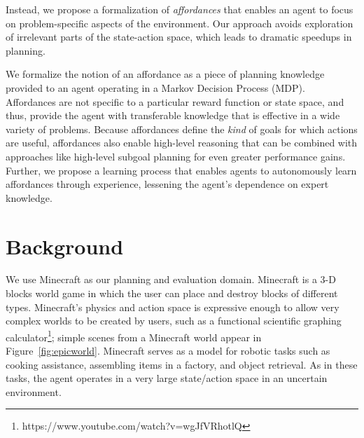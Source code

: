 \documentclass[conference]{IEEEtran}
\begin{document}
Instead, we propose a formalization of {\em affordances} \citep{gibson77} that enables an agent to focus on
problem-specific aspects of the environment. Our approach avoids exploration of irrelevant parts of the 
state-action space, which leads to dramatic speedups in planning.

We formalize the notion of an affordance as a piece of planning
knowledge provided to an agent operating in a Markov Decision
Process (MDP). Affordances are not specific to a particular reward 
function or state space, and thus, provide the agent with transferable 
knowledge that is effective in a wide variety of problems. Because affordances
define the {\em kind} of goals for which actions are useful,
affordances also enable high-level reasoning that can
be combined with approaches like high-level subgoal planning for even
greater performance gains. Further, we propose a learning process that
enables agents to autonomously learn affordances through experience, lessening
the agent's dependence on expert knowledge.


\section{Background}
\label{sec:background}
We use Minecraft as our planning and evaluation domain. Minecraft is a
3-D blocks world game in which the user can place and destroy blocks
of different types.  Minecraft's physics and action space is expressive
enough to allow very complex worlds to be created by users, such as a
functional scientific graphing calculator\footnote{https://www.youtube.com/watch?v=wgJfVRhotlQ};
simple scenes from a Minecraft world appear in Figure~\ref{fig:epicworld}.   Minecraft serves as a model for robotic tasks such as cooking assistance, assembling items in a factory, and object retrieval.  As in these tasks,  the agent operates in a very large state/action space in an uncertain environment. 
\end{document}
